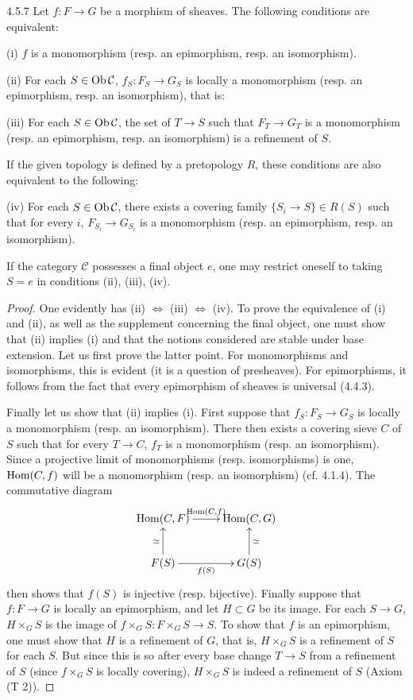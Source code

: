 \begin{proposition}{4.5.7}\label{IV.4.5.7}
Let \(f:F\to G\) be a morphism of sheaves.
The following conditions are equivalent:

(i) \(f\) is a monomorphism (resp. an epimorphism, resp. an isomorphism).

(ii) For each \(S\in\operatorname{Ob}\mathcal C\), \(f_S:F_S\to G_S\)
is locally a monomorphism (resp. an epimorphism, resp. an
isomorphism), that is:

(iii) For each \(S\in\operatorname{Ob}\mathcal C\), the set of \(T\to S\)
such that \(F_T\to G_T\) is a monomorphism (resp. an
epimorphism, resp. an isomorphism) is a refinement of \(S\).

If the given topology is defined by a pretopology \(R\),
these conditions are also equivalent to the following:

(iv) For each \(S\in\operatorname{Ob}\mathcal C\), there exists a covering
family \(\{S_i\to S\}\in R(S)\) such that for every \(i\),
\(F_{S_i}\to G_{S_i}\) is a monomorphism (resp. an
epimorphism, resp. an isomorphism).

If the category \(\mathcal C\) possesses a final object \(e\),
one may restrict oneself to taking \(S=e\) in conditions
(ii), (iii), (iv).
\end{proposition}
\begin{proof}
One evidently has (ii) \(\Leftrightarrow\) (iii)
\(\Leftrightarrow\) (iv).
To prove the equivalence of (i) and (ii), as well as the
supplement concerning the final object, one must show that
(ii) implies (i) and that the notions considered are stable
under base extension. Let us first prove the latter point.
For monomorphisms and isomorphisms, this is evident
(it is a question of presheaves). For epimorphisms, it follows
from the fact that every epimorphism of sheaves is universal (4.4.3).

Finally let us show that (ii) implies (i).
First suppose that \(f_S:F_S\to G_S\) is locally a monomorphism
(resp. an isomorphism). There then exists a covering sieve \(C\)
of \(S\) such that for every \(T\to C\), \(f_T\) is a
monomorphism (resp. an isomorphism). Since a projective limit
of monomorphisms (resp. isomorphisms) is one,
\(\operatorname{Hom}(C,f)\) will be a monomorphism (resp. an isomorphism)
(cf. 4.1.4). The commutative diagram
\[
\xymatrix{
\Hom(C,F)\ar[r]^{\Hom(C,f)} & \Hom(C,G)\\
F(S)\ar[u]^{\simeq}\ar[r]_{f(S)} & G(S)\ar[u]_{\simeq} }
\]
then shows that \(f(S)\) is injective (resp. bijective).
Finally suppose that \(f:F\to G\) is locally an epimorphism,
and let \(H\subset G\) be its image.
For each \(S\to G\), \(H\times_G S\) is the image of
\(f\times_G S:F\times_G S\to S\).
To show that \(f\) is an epimorphism, one must show that
\(H\) is a refinement of \(G\), that is, \(H\times_G S\)
is a refinement of \(S\) for each \(S\).
But since this is so after every base change \(T\to S\)
from a refinement of \(S\) (since \(f\times_G S\) is locally
covering), \(H\times_G S\) is indeed a refinement of \(S\)
(Axiom (T 2)).
\end{proof}

